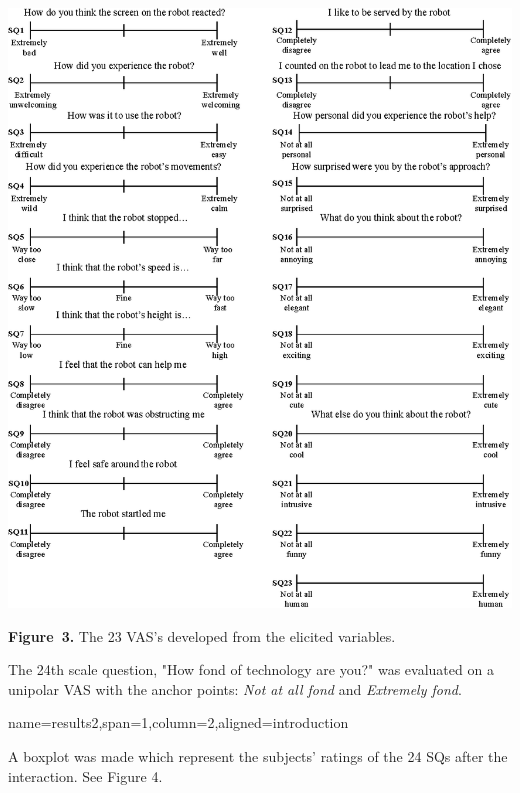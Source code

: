 \documentclass[paperwidth=118cm,paperheight=84cm,landscape,fontscale=0.2941]{baposter}
\begin{document}
\begin{poster}
{\vspace{-10pt}
\begin{center}
	\includegraphics[width=1.0\linewidth]{AllScalesSpaceBig.eps}

\textbf{Figure~3. }\footnotesize{The 23 VAS's developed from the elicited variables.}
\end{center}
\vspace{-10pt}
The 24th scale question, "How fond of technology are you?" was evaluated on a unipolar VAS with the anchor points: \textit{Not at all fond} and \textit{Extremely fond}.
}



{name=results2,span=1,column=2,aligned=introduction}
{\parskip 5pt
A boxplot was made which represent the subjects' ratings of the 24 SQs after the interaction. See Figure 4. 
\begin{center}


\end{center}}
\end{poster}
\end{document}
